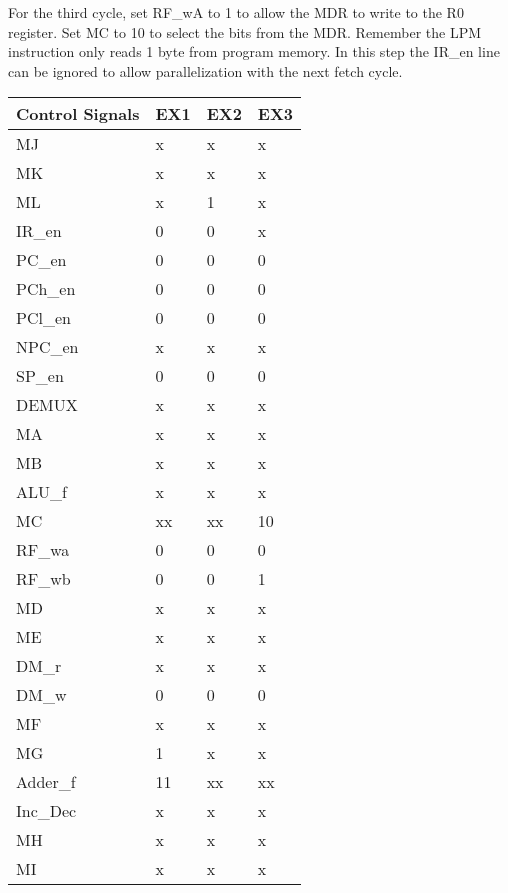 \documentclass[12pt,letterpaper]{article}
\begin{document}
\begin{enumerate}
\begin{enumerate}
        For the third cycle, set RF\_wA to 1 to allow the MDR to write to the R0 register. Set MC to 10 to select the bits from the MDR. Remember the LPM instruction only reads 1 byte from program memory. In this step the IR\_en line can be ignored to allow parallelization with the next fetch cycle.\\
            \begin{tabular}{l l l l}
                 Control Signals & EX1 & EX2 & EX3\\
                 \hline
                 MJ & x & x & x \\
                 MK & x & x & x \\
                 ML & x & 1 & x \\
                 IR\_en & 0 & 0 & x \\
                 PC\_en & 0 & 0 & 0 \\
                 PCh\_en & 0 & 0 & 0\\
                 PCl\_en & 0 & 0 & 0\\
                 NPC\_en & x & x & x\\
                 SP\_en & 0 & 0 & 0\\
                 DEMUX & x & x & x \\
                 MA & x & x & x \\
                 MB & x & x & x \\
                 ALU\_f & x & x & x \\
                 MC & xx & xx & 10 \\
                 RF\_wa & 0 & 0 & 0 \\
                 RF\_wb & 0 & 0 & 1 \\
                 MD & x & x & x \\
                 ME & x & x & x \\
                 DM\_r & x & x & x \\
                 DM\_w & 0 & 0 & 0 \\
                 MF & x & x & x \\
                 MG & 1 & x & x \\
                 Adder\_f & 11 & xx & xx \\
                 Inc\_Dec & x & x & x \\
                 MH & x & x & x \\
                 MI & x & x & x \\
            \end{tabular}


\end{enumerate}
\end{enumerate}
\end{document}

